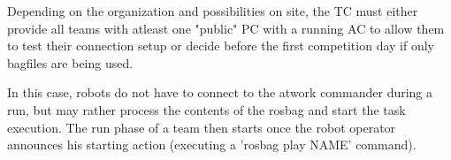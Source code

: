 Depending on the organization and possibilities on site, the TC must either provide all teams with atleast one "public" PC with a running AC to allow them to test their connection setup or decide before the first competition day if only bagfiles are being used.

In this case, robots do not have to connect to the atwork commander during a run, but may rather process the contents of the rosbag and start the task execution.
The run phase of a team then starts once the robot operator announces his starting action (executing a 'rosbag play NAME' command). 



